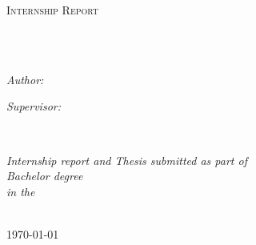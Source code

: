 \documentclass[
11pt, %
english,
singlespacing, %
headsepline, %
]{BachelorThesis} %
\author{Kleio Fragkedaki} %
\begin{document}
\frontmatter %

\pagestyle{plain} %


\begin{titlepage}
\begin{center}

\vspace*{.06\textheight}
{\scshape\LARGE \univname\par}\vspace{1.5cm} %
\textsc{\Large Internship Report}\\[0.5cm] %

\HRule \\[0.4cm] %
{\huge \bfseries \ttitle\par}\vspace{0.4cm} %
\HRule \\[1.5cm] %
 
\begin{minipage}[t]{0.4\textwidth}
\begin{flushleft} \large
\emph{Author:}\\
{\authorname} 
\end{flushleft}
\end{minipage}
\begin{minipage}[t]{0.4\textwidth}
\begin{flushright} \large
\emph{Supervisor:} \\
{\supname} 
\end{flushright}
\end{minipage}\\[3cm]
 
\vfill

\large \textit{Internship report and Thesis submitted as part of\\ Bachelor degree}\\[0.3cm]
\textit{in the}\\[0.4cm]
\deptname\\[2cm] %
 
\vfill
\vspace{5cm}

{\large \today}\\[4cm] %
 
\end{center}
\end{titlepage}
\end{document}
